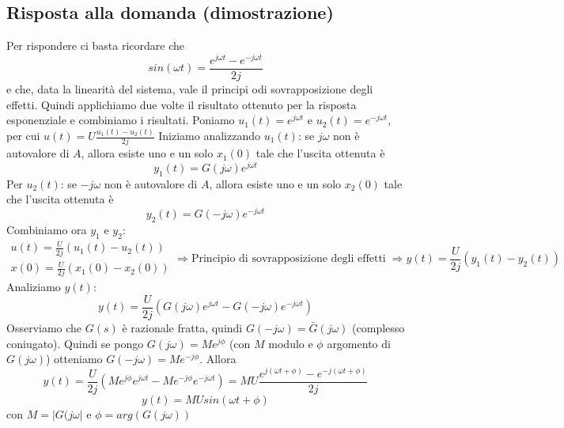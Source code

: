 \subsection{Risposta alla domanda (dimostrazione)}
Per rispondere ci basta ricordare che 
\[
    sin(\omega t) = \frac{e^{j \omega t} - e^{-j \omega t}}{2 j}
\]
e che, data la linearità del sistema, vale il principi odi sovrapposizione degli effetti. Quindi applichiamo due volte il risultato ottenuto per la risposta esponenziale e combiniamo i risultati.\newline
\newline
Poniamo $u_1(t) = e^{j \omega t}$ e $u_2(t) = e^{-j \omega t}$, per cui $u(t) = U \frac{u_1(t) - u_2(t)}{2j}$\newline
\newline
Iniziamo analizzando $u_1(t)$: se $j \omega$ non è autovalore di $A$, allora esiste uno e un solo $x_1(0)$ tale che l'uscita ottenuta è 
\[
    y_1(t) = G(j \omega) e^{j \omega t}
\]
Per $u_2(t)$: se $-j \omega$ non è autovalore di $A$, allora esiste uno e un solo $x_2(0)$ tale che l'uscita ottenuta è 
\[
    y_2(t) = G(-j \omega) e^{-j \omega t}
\]
Combiniamo ora $y_1$ e $y_2$:
\[
    \begin{matrix}
        u(t) = \frac{U}{2j} (u_1(t) - u_2(t))\\
        x(0) = \frac{U}{2j} (x_1(0) - x_2(0))
    \end{matrix} \Longrightarrow \text{Principio di sovrapposizione degli effetti}\; \Longrightarrow y(t) =\frac{U}{2j}(y_1(t) -y_2(t))
\]
Analiziamo $y(t)$:
\[
    y(t) = \frac{U}{2j}\left( G(j \omega)e^{j \omega t} - G(-j \omega)e^{- j \omega t} \right)
\]
Osserviamo che $G(s)$ è razionale fratta, quindi $G(-j \omega) = \bar{G}(j \omega)$ (complesso coniugato). Quindi se pongo $G(j \omega) = M e^{j \phi}$ (con $M$ modulo e $\phi$ argomento di $G(j \omega)$) otteniamo $G(-j \omega) = M e^{- j \phi}$.\newline
\newline
Allora
\[
    y(t) = \frac{U}{2j} \left( M e^{j \phi} e^{j \omega t} - Me^{-j \phi} e^{-j \omega t} \right) = M U \frac{e^{j (\omega t + \phi)} - e^{-j(\omega t + \phi)}}{2j}
\]
\[
    y(t) = MU sin(\omega t + \phi)
\]
con $M= |G(j \omega|$ e $\phi = arg(G(j \omega))$

